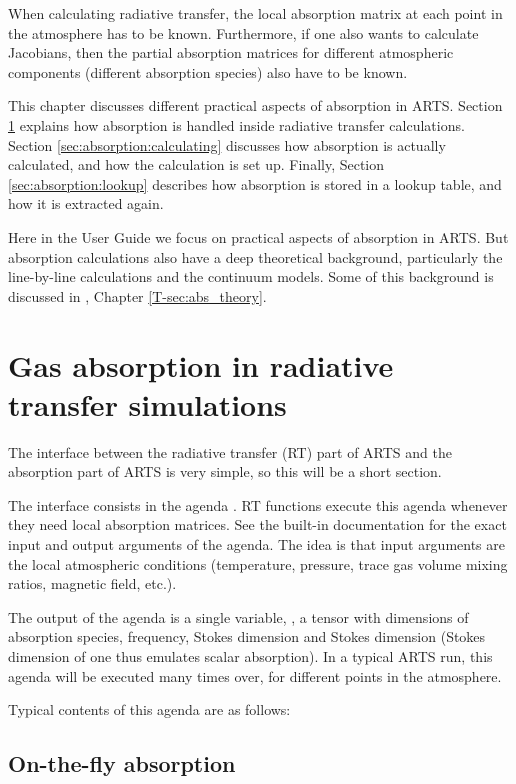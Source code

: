 When calculating radiative transfer, the local absorption matrix
at each point in the atmosphere has to be known.  Furthermore, if one
also wants to calculate Jacobians, then the partial absorption
matrices for different atmospheric components (different
absorption species) also have to be known.   

This chapter discusses different practical aspects of absorption in
ARTS. Section \ref{sec:absorption:abs-rt} explains how absorption is
handled inside radiative transfer calculations.  Section
\ref{sec:absorption:calculating} discusses how absorption is actually
calculated, and how the calculation is set up.  Finally, Section
\ref{sec:absorption:lookup} describes how absorption is stored in a
lookup table, and how it is extracted again.

Here in the User Guide we focus on practical aspects of absorption in
ARTS.  But absorption calculations also have a deep theoretical
background, particularly the line-by-line calculations and the
continuum models.  Some of this background is discussed in \theory,
Chapter \ref{T-sec:abs_theory}. 

\section{Gas absorption in radiative transfer simulations}
\label{sec:absorption:abs-rt}

The interface between the radiative transfer (RT) part of ARTS and the
absorption part of ARTS is very simple, so this will be a short
section.

The interface consists in the agenda
.  RT functions execute this agenda
whenever they need local absorption matrices.  See the built-in
documentation for the exact input and output arguments of the agenda.
The idea is that input arguments are the local atmospheric conditions
(temperature, pressure, trace gas volume mixing ratios, magnetic field, etc.).

The output of the agenda is a single variable,
, a tensor with dimensions of absorption species,
frequency, Stokes dimension and Stokes dimension (Stokes dimension of one thus emulates scalar absorption).
In a typical ARTS run, this agenda will be
executed many times over, for different points in the atmosphere.

Typical contents of this agenda are as follows:

\subsection{On-the-fly absorption}
\label{sec:absorption:abs-rt-otf}

